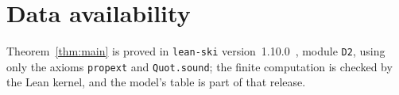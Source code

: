\documentclass[11pt]{amsart}
\theoremstyle{definition}
\begin{document}
\section*{Data availability}
Theorem~\ref{thm:main} is proved in \texttt{lean-ski} version~1.10.0~\citep{leanski}, module
\texttt{D2}, using only the axioms \texttt{propext} and \texttt{Quot.sound}; the finite computation
is checked by the Lean kernel, and the model's table is part of that release.



\end{document}
